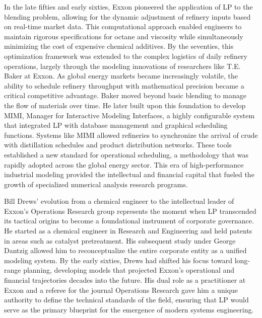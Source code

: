 In the late fifties and early sixties, Exxon pioneered the application of LP to the blending problem, allowing for the dynamic adjustment of refinery inputs based on real-time market data. This computational approach enabled engineers to maintain rigorous specifications for octane and viscosity while simultaneously minimizing the cost of expensive chemical additives. By the seventies, this optimization framework was extended to the complex logistics of daily refinery operations, largely through the modeling innovations of researchers like T.E. Baker at Exxon. As global energy markets became increasingly volatile, the ability to schedule refinery throughput with mathematical precision became a critical competitive advantage. Baker moved beyond basic blending to manage the flow of materials over time. He later built upon this foundation to develop MIMI, Manager for Interactive Modeling Interfaces, a highly configurable system that integrated LP with database management and graphical scheduling functions. Systems like MIMI allowed refineries to synchronize the arrival of crude with distillation schedules and product distribution networks. These tools established a new standard for operational scheduling, a methodology that was rapidly adopted across the global energy sector. This era of high-performance industrial modeling provided the intellectual and financial capital that fueled the growth of specialized numerical analysis research programs. 

Bill Drews’ evolution from a chemical engineer to the intellectual leader of Exxon’s Operations Research group represents the moment when LP transcended its tactical origins to become a foundational instrument of corporate governance. He started as a chemical engineer in Research and Engineering and held patents in areas such as catalyst pretreatment. His subsequent study under George Dantzig allowed him to reconceptualize the entire corporate entity as a unified modeling system. By the early sixties, Drews had shifted his focus toward long-range planning, developing models that projected Exxon’s operational and financial trajectories decades into the future. His dual role as a practitioner at Exxon and a referee for the journal Operations Research gave him a unique authority to define the technical standards of the field, ensuring that LP would serve as the primary blueprint for the emergence of modern systems engineering. 

